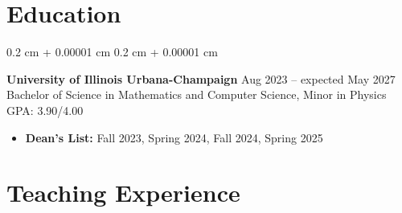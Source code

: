 \documentclass[10pt, letterpaper]{article}
\newenvironment{highlights}{
    \vspace*{2.5 pt}
    \begin{itemize}[
        topsep=0 cm,
        parsep=0 cm,
        partopsep=0pt,
        itemsep=2.5 pt,
        leftmargin=0.4 cm + 10pt
    ]
}{
    \end{itemize}
} %
\newenvironment{highlightsforbulletentries}{
    \begin{itemize}[
        topsep=0.10 cm,
        parsep=0.10 cm,
        partopsep=0pt,
        itemsep=0pt,
        leftmargin=10pt
    ]
}{
    \end{itemize}
} %
\newenvironment{onecolentry}{
    \begin{adjustwidth}{
        0.2 cm + 0.00001 cm
    }{
        0.2 cm + 0.00001 cm
    }
}{
    \end{adjustwidth}
} %
\let\hrefWithoutArrow\href
\renewcommand{\href}[2]{\hrefWithoutArrow{#1}{\ifthenelse{\equal{#2}{}}{ }{#2 }\raisebox{.15ex}{\footnotesize \faExternalLink*}}}
\begin{document}
    









    \section{Education}
        \begin{onecolentry}   
            \textbf{University of Illinois Urbana-Champaign} \hfill
            Aug 2023 -- expected May 2027 \\
            Bachelor of Science in Mathematics and Computer Science, Minor in Physics \hfill GPA: 3.90{\footnotesize /4.00}
            
            \begin{highlights}
                \item \textbf{Dean's List:} Fall 2023, Spring 2024, Fall 2024, Spring 2025
            \end{highlights}
        \end{onecolentry}

        \vspace{0.3cm}

    
    \section{Teaching Experience}
\end{document}
